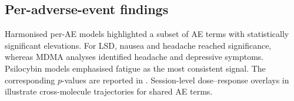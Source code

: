 \documentclass[11pt,a4paper]{article}
\begin{document}


\subsection{Per-adverse-event findings}
Harmonised per-AE models highlighted a subset of AE terms with statistically significant elevations. For LSD, nausea and headache reached significance, whereas MDMA analyses identified headache and depressive symptoms. Psilocybin models emphasised fatigue as the most consistent signal. The corresponding $p$-values are reported in . Session-level dose--response overlays in  illustrate cross-molecule trajectories for shared AE terms.
\end{document}
